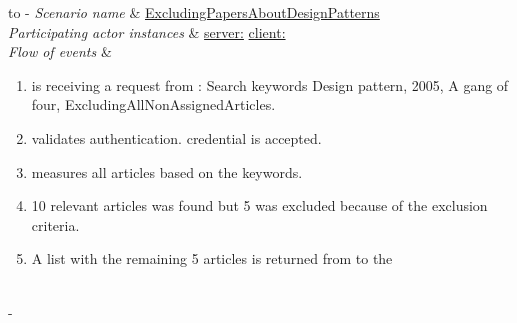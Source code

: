 %
%
\begin{table}[h!]
	\tabulinesep=1.5mm
	\begin{tabu} to 
		\tabucline[1.5pt]-
		\textit{Scenario name} & \underline{ExcludingPapersAboutDesignPatterns} \\
		\hline
		\textit{Participating actor \newline instances} & \underline{server:\serverside}
		\newline \underline{client:\clientside} \\
		\hline
		\textit{Flow of events} &
		\vspace{-3mm}
		\begin{enumerate}[leftmargin=*,topsep=0pt,itemsep=-1ex]
			\item \serverside is receiving a request from \clientside: Search keywords {Design pattern, 2005, A gang of four}, Excluding{AllNonAssignedArticles}.
			
			\item \serverside validates \user authentication. \user credential is accepted.
			
			\item \serverside measures all articles based on the keywords.
			
			\item 10 relevant articles was found but 5 was excluded because of the exclusion criteria.
			
			\item A list with the remaining 5 articles is returned from \serverside to the \clientside\\				
		\end{enumerate} \\
		\tabucline[1.5pt]-
	\end{tabu}
	\caption{Scenario when a user wants to exclude some papers.}
	\label{sc:ExcludingPapersAboutDesignPatterns}
\end{table}


